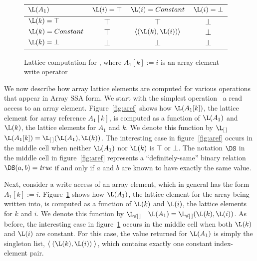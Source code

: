 \begin{figure}%
\begin{center}
\begin{tabular}{|l||c|c|c|}
\hline
$\L(A_1)$ & $\L(i) = \top$ & $\L(i) = Constant$ & $\L(i) = \bot$ \\
\hline \hline
$\L(k) = \top$ & $\top$ & $\top$ & $\bot$ \\
\hline
$\L(k) = Constant$ & $\top$ & $\langle(\L(k),\L(i))\rangle$ & $\bot$ \\
\hline
$\L(k) = \bot$ & $\bot$ & $\bot$ & $\bot$ \\
\hline
\end{tabular}
\end{center}
\caption{Lattice computation for ,
where $A_1[k] := i$ is an 
array element write operator}
\label{fig:adef}
\end{figure}

We now describe how array lattice elements are computed for various
operations that appear in Array SSA form.  We start with the simplest operation
\viz\ a read access to an array element.
Figure~\ref{fig:aref} shows how $\L(A_1[k])$, the lattice element for array
reference $A_1[k]$, is computed as a function of $\L(A_1)$ and $\L(k)$, 
the lattice elements for $A_1$ and $k$.
We denote this function
by $\L_{[\:]}$ \ie\ $\L(A_1[k]) = \L_{[\:]}(\L(A_1),\L(k))$.  
The interesting case in figure~\ref{fig:aref} occurs
in the middle cell
when neither $\L(A_1)$ nor $\L(k)$ is $\top$ or $\bot$.
The notation $\DS$ in the middle cell in figure~\ref{fig:aref}
represents a ``definitely-same'' binary relation \ie\ $\DS(a,b) =
\mbox{\it true}$ if and only if $a$ and $b$ are known to have exactly
the same value.  %

Next, consider a write access of an array element, which 
in general has the form $A_1[k] := i$.
Figure~\ref{fig:adef} shows how $\L(A_1)$, the lattice element for 
the array being written into,
is computed as a function of $\L(k)$ and $\L(i)$, 
the lattice elements for $k$ and $i$.  We denote this function
by $\L_{d[\:]}$ \ie\ $\L(A_1) = \L_{d[\:]}(\L(k),\L(i))$.  
As before,
the interesting case in figure~\ref{fig:adef} occurs
in the middle cell
when both $\L(k)$ and $\L(i)$ are constant.
For this case, the value returned for $\L(A_1)$ is simply 
the singleton list,
$\langle\;(\L(k),\L(i))\;\rangle$, which contains exactly
one constant index-element pair.



